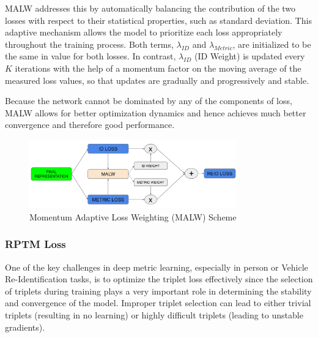 MALW addresses this by automatically balancing the contribution of the two losses with respect to their statistical properties, such as standard deviation. This adaptive mechanism allows the model to prioritize each loss appropriately throughout the training process.
Both terms, \(\lambda_{\textit{ID}}\) and \(\lambda_{\textit{Metric}}\), are initialized to be the same in value for both losses. In contrast, \(\lambda_{\textit{ID}}\) (ID Weight) is updated every \(K\) iterations with the help of a momentum factor on the moving average of the measured loss values, so that updates are gradually and progressively and stable.

Because the network cannot be dominated by any of the components of loss, MALW allows for better optimization dynamics and hence achieves much better convergence and therefore good performance.

\begin{figure}[H]
    \centering
    \includegraphics[width=0.8\textwidth]{images/MALW.jpg}
    \caption[Momentum Adaptive Loss Weighting (MALW) Scheme]{Momentum Adaptive Loss Weighting (MALW) Scheme}
    \label{fig:MALW}
\end{figure}

\subsubsection{RPTM Loss}
One of the key challenges in deep metric learning, especially in person or Vehicle Re-Identification tasks, is to optimize the triplet loss effectively since the selection of triplets during training plays a very important role in determining the stability and convergence of the model. Improper triplet selection can lead to either trivial triplets (resulting in no learning) or highly difficult triplets (leading to unstable gradients).

